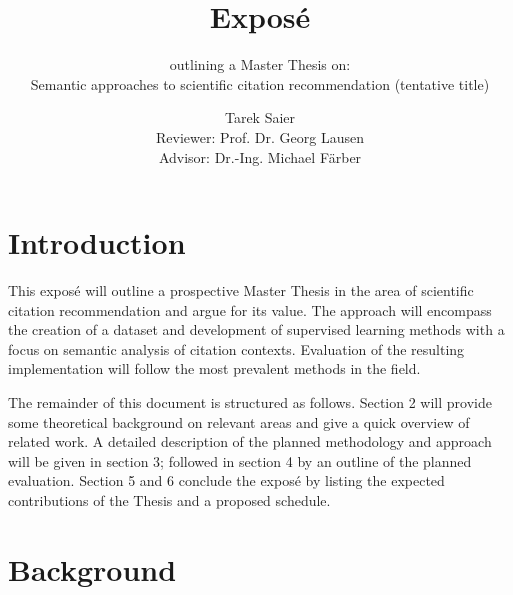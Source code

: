 \documentclass{proseminar}
\begin{document}

\title{Expos\'e}
\subtitle{outlining a Master Thesis on:\\Semantic approaches to scientific citation recommendation (tentative title)}

\author{Tarek Saier\\Reviewer: Prof. Dr. Georg Lausen\\Advisor: Dr.-Ing. Michael Färber}

\maketitle

\section{Introduction}
This expos\'e will outline a prospective Master Thesis in the area of scientific citation recommendation and argue for its value. The approach will encompass the creation of a dataset and development of supervised learning methods with a focus on semantic analysis of citation contexts. Evaluation of the resulting implementation will follow the most prevalent methods in the field.

The remainder of this document is structured as follows. Section 2 will provide some theoretical background on relevant areas and give a quick overview of related work. A detailed description of the planned methodology and approach will be given in section 3; followed in section 4 by an outline of the planned evaluation. Section 5 and 6 conclude the expos\'e by listing the expected contributions of the Thesis and a proposed schedule.

\section{Background}
\end{document}
